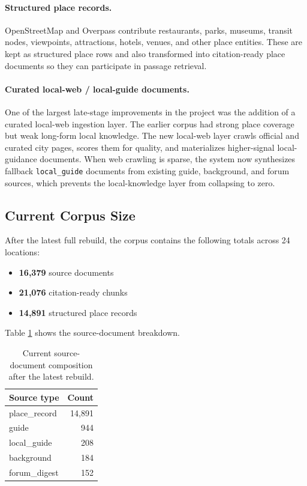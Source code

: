 \documentclass[11pt]{article}
\begin{document}
\paragraph{Structured place records.}
OpenStreetMap and Overpass contribute restaurants, parks, museums, transit nodes, viewpoints, attractions, hotels, venues, and other place entities. These are kept as structured place rows and also transformed into citation-ready place documents so they can participate in passage retrieval.

\paragraph{Curated local-web / local-guide documents.}
One of the largest late-stage improvements in the project was the addition of a curated local-web ingestion layer. The earlier corpus had strong place coverage but weak long-form local knowledge. The new local-web layer crawls official and curated city pages, scores them for quality, and materializes higher-signal local-guidance documents. When web crawling is sparse, the system now synthesizes fallback \texttt{local\_guide} documents from existing guide, background, and forum sources, which prevents the local-knowledge layer from collapsing to zero.

\subsection{Current Corpus Size}
After the latest full rebuild, the corpus contains the following totals across 24 locations:
\begin{itemize}[leftmargin=*]
    \item \textbf{16,379} source documents
    \item \textbf{21,076} citation-ready chunks
    \item \textbf{14,891} structured place records
\end{itemize}

Table \ref{tab:source-breakdown} shows the source-document breakdown.

\begin{table}[H]
\centering
\caption{Current source-document composition after the latest rebuild.}
\label{tab:source-breakdown}
\begin{tabular}{lr}
\toprule
Source type & Count \\
\midrule
place\_record & 14,891 \\
guide & 944 \\
local\_guide & 208 \\
background & 184 \\
forum\_digest & 152 \\
\bottomrule
\end{tabular}
\end{table}
\end{document}
